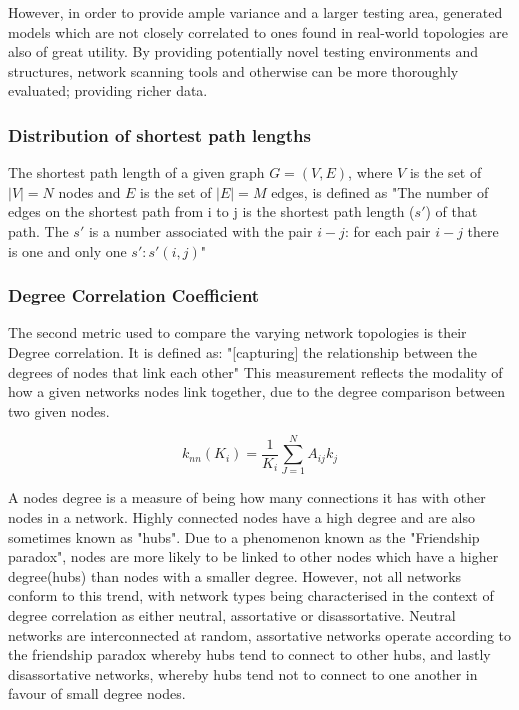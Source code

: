 However, in order to provide ample variance and a larger testing area, generated models which are not closely correlated to ones found in real-world topologies are also of great utility. By providing potentially novel testing environments and structures, network scanning tools and otherwise can be more thoroughly evaluated; providing richer data.

\subsubsection{Distribution of shortest path lengths}
The shortest path length of a given graph $G = (V,E)$, where $V$ is the set of $|V|=N$ nodes and $E$ is the set of $|E|=M$ edges, is defined as "The number of edges on the shortest path from i to j is the shortest path length ($s'$) of that path. The $s'$ is a number associated with the pair $i-j$: for each pair $i-j$ there is one and only one $s':s'(i,j)$"\cite{santos2022shortestpathpathlength} \cite{DSPL_second_source}

\subsubsection{Degree Correlation Coefficient}
The second metric used to compare the varying network topologies is their Degree correlation. It is defined as:
"[capturing] the relationship between the degrees of nodes that link each other" \cite{barabasi2016network} This measurement reflects the modality of how a given networks nodes link together, due to the degree comparison between two given nodes. 

\begin{equation}
    k_{nn}(K_i) = \frac{1}{K_i}\sum^{N}_{J=1}A_{ij}k_j
\end{equation}

A nodes degree is a measure of being how many connections it has with other nodes in a network. Highly connected nodes have a high degree and are also sometimes known as "hubs". Due to a phenomenon known as the "Friendship paradox", nodes are more likely to be linked to other nodes which have a higher degree(hubs) than nodes with a smaller degree. However, not all networks conform to this trend, with network types being characterised in the context of degree correlation as either neutral, assortative or disassortative. Neutral networks are interconnected at random, assortative networks operate according to the friendship paradox whereby hubs tend to connect to other hubs, and lastly disassortative networks, whereby hubs tend not to connect to one another in favour of small degree nodes. 

